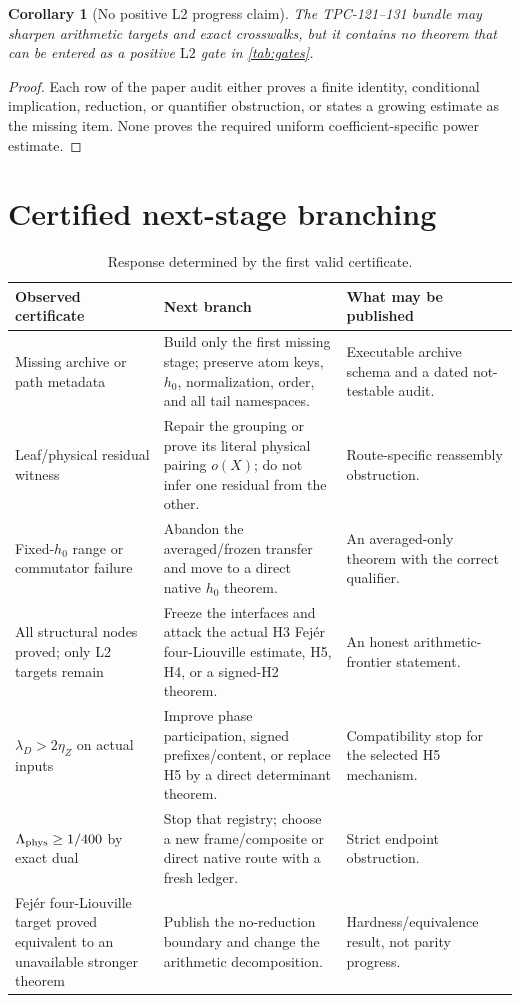 \documentclass[11pt]{article}
\newtheorem{corollary}[theorem]{Corollary}
\theoremstyle{definition}
\theoremstyle{remark}
\newcommand{\Ltwo}{\mathrm{L2}}
\begin{document}
\begin{corollary}[No positive L2 progress claim]
The TPC-121--131 bundle may sharpen arithmetic targets and exact
crosswalks, but it contains no theorem that can be entered as a
positive \(\Ltwo\) gate in \cref{tab:gates}.
\end{corollary}

\begin{proof}
Each row of the paper audit either proves a finite identity,
conditional implication, reduction, or quantifier obstruction, or
states a growing estimate as the missing item.  None proves the
required uniform coefficient-specific power estimate.
\end{proof}

\section{Certified next-stage branching}

\begin{table}[htbp]
\centering
\scriptsize
\caption{Response determined by the first valid certificate.}
\begin{tabularx}{\textwidth}{@{}P{0.25\textwidth}Y Y@{}}
\toprule
Observed certificate & Next branch & What may be published\\
\midrule
Missing archive or path metadata &
Build only the first missing stage; preserve atom keys, \(h_0\),
normalization, order, and all tail namespaces. &
Executable archive schema and a dated not-testable audit.\\
Leaf/physical residual witness &
Repair the grouping or prove its literal physical pairing \(o(X)\);
do not infer one residual from the other. &
Route-specific reassembly obstruction.\\
Fixed-\(h_0\) range or commutator failure &
Abandon the averaged/frozen transfer and move to a direct native
\(h_0\) theorem. &
An averaged-only theorem with the correct qualifier.\\
All structural nodes proved; only L2 targets remain &
Freeze the interfaces and attack the actual H3 Fej\'er
four-Liouville estimate, H5, H4, or a signed-H2 theorem. &
An honest arithmetic-frontier statement.\\
\(\lambda_D>2\eta_Z\) on actual inputs &
Improve phase participation, signed prefixes/content, or replace H5
by a direct determinant theorem. &
Compatibility stop for the selected H5 mechanism.\\
\(\Lambda_{\rm phys}\ge1/400\) by exact dual &
Stop that registry; choose a new frame/composite or direct native
route with a fresh ledger. &
Strict endpoint obstruction.\\
Fej\'er four-Liouville target proved equivalent to an unavailable
stronger theorem &
Publish the no-reduction boundary and change the arithmetic
decomposition. &
Hardness/equivalence result, not parity progress.\\
\bottomrule
\end{tabularx}
\end{table}
\end{document}
